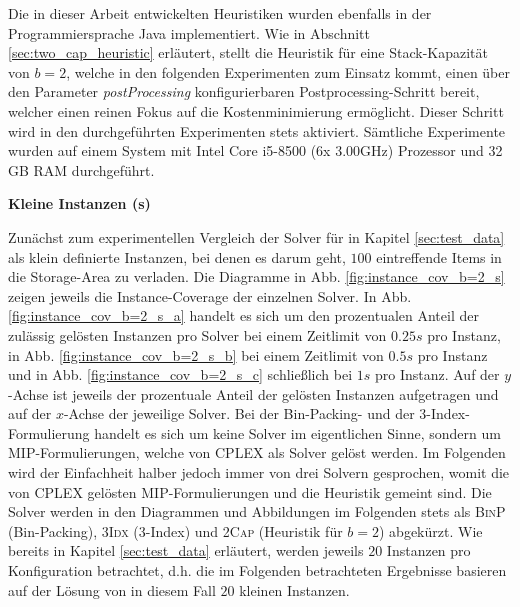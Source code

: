 Die in dieser Arbeit entwickelten Heuristiken wurden ebenfalls in der Programmiersprache Java implementiert.
Wie in Abschnitt \ref{sec:two_cap_heuristic} erläutert, stellt die Heuristik für eine Stack-Kapazität von $b = 2$,
welche in den folgenden Experimenten zum Einsatz kommt, einen über den Parameter \textit{postProcessing} konfigurierbaren
Postprocessing-Schritt bereit, welcher einen reinen Fokus auf die Kostenminimierung ermöglicht. Dieser Schritt wird
in den durchgeführten Experimenten stets aktiviert. Sämtliche Experimente wurden auf einem System mit Intel Core i5-8500 (6x 3.00GHz) Prozessor und 32 GB RAM durchgeführt.

\textbf{Kleine Instanzen (s)}

Zunächst zum experimentellen Vergleich der Solver für in Kapitel \ref{sec:test_data} als klein definierte Instanzen,
bei denen es darum geht, $100$ eintreffende Items in die Storage-Area zu verladen.
Die Diagramme in Abb. \ref{fig:instance_cov_b=2_s} zeigen jeweils die Instance-Coverage der einzelnen Solver.
In Abb. \ref{fig:instance_cov_b=2_s_a} handelt es sich um den prozentualen Anteil der zulässig gelösten Instanzen pro Solver bei einem Zeitlimit von $0.25s$ pro Instanz, in Abb. \ref{fig:instance_cov_b=2_s_b} bei einem Zeitlimit von $0.5s$ pro Instanz und in Abb. \ref{fig:instance_cov_b=2_s_c} schließlich bei $1s$ pro Instanz.\newline
Auf der $y$-Achse ist jeweils der prozentuale Anteil der gelösten Instanzen aufgetragen und auf der $x$-Achse der jeweilige Solver. Bei der Bin-Packing- und der 3-Index-Formulierung handelt es sich um keine Solver im eigentlichen Sinne,
sondern um MIP-Formulierungen, welche von \textsc{CPLEX} als Solver gelöst werden.
Im Folgenden wird der Einfachheit halber jedoch immer von drei Solvern gesprochen, womit die von
\textsc{CPLEX} gelösten MIP-Formulierungen und die Heuristik gemeint sind.
Die Solver werden in den Diagrammen und Abbildungen im Folgenden stets als \textsc{BinP} (Bin-Packing),
\textsc{3Idx} (3-Index) und \textsc{2Cap} (Heuristik für $b = 2$) abgekürzt.
Wie bereits in Kapitel \ref{sec:test_data} erläutert, werden jeweils $20$ Instanzen pro Konfiguration betrachtet,
d.h. die im Folgenden betrachteten Ergebnisse basieren auf der Lösung von in diesem Fall $20$ kleinen Instanzen.

